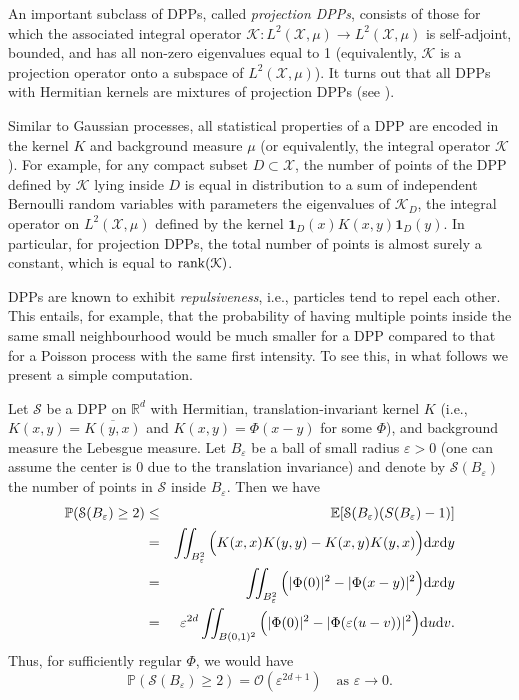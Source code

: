 An important subclass of DPPs, called \emph{projection DPPs}, consists of those for which the associated integral operator $\mathcal K: L^2(\mathcal X,\mu) \rightarrow L^2(\mathcal X,\mu)$ is self-adjoint, bounded, and has all non-zero eigenvalues equal to 1 (equivalently, $\mathcal K$ is a projection operator onto a subspace of $L^2(\mathcal X,\mu)$). It turns out that all DPPs with Hermitian kernels are mixtures of projection DPPs (see \cite{HKPV}).

Similar to Gaussian processes, all statistical properties of a DPP are encoded in the
kernel $K$ and background measure $\mu$ (or equivalently, the integral operator $\mathcal K$). For example, for any compact subset $D\subset \mathcal X$, the number of points of the DPP defined by $\mathcal K$ lying inside $D$ is equal in distribution to a sum of independent Bernoulli random variables with parameters the eigenvalues of $\mathcal K_D$, the integral operator on $L^2(\mathcal X,\mu)$ defined by the kernel $\mathbf{1}_D(x)K(x,y)\mathbf{1}_D(y)$. In particular, for projection DPPs, the total number of points is almost surely a constant, which is equal to $\rank(\mathcal K)$.

DPPs are known to exhibit \emph{repulsiveness}, i.e., particles tend to repel each other. This entails, for example, that the probability of having multiple points inside the same small neighbourhood would be much smaller for a DPP compared to that for a Poisson process with the same first intensity. To see this, in what follows we present a simple computation.

Let $\mathcal S$ be a DPP on $\mathbb R^d$ with Hermitian, translation-invariant kernel $K$ (i.e., $K(x,y) = \overline{K(y,x)}$ and $K(x,y)=\Phi(x-y)$ for some $\Phi$), and background measure the Lebesgue measure. Let $B_\varepsilon$ be a ball of small radius $\varepsilon>0$ (one can assume the center is $0$ due to the translation invariance) and denote by $\mathcal S(B_\varepsilon)$ the number of points in $\mathcal S$ inside $B_\varepsilon$. Then we have
\begin{eqnarray*}
    \mathbb P(\mathcal S(B_\varepsilon) \ge 2) &\le& \mathbb E[\mathcal S(B_\varepsilon)(S(B_\varepsilon)-1)] \\
    &=&\iint_{B_\varepsilon^2} \Big( K(x,x)K(y,y) - K(x,y)K(y,x) \Big ) \mathrm{d} x \mathrm{d} y\\
    &=&\iint_{B_\varepsilon^2} \Big( |\Phi(0)|^2 - |\Phi(x-y)|^2 \Big ) \mathrm{d} x \mathrm{d} y \\
    &=& \varepsilon^{2d} \iint_{B(0,1)^2} \Big( |\Phi(0)|^2 - |\Phi(\varepsilon(u-v))|^2 \Big ) \mathrm{d} u \mathrm{d} v.
\end{eqnarray*}
Thus, for sufficiently regular $\Phi$, 
we would have
\begin{equation} \label{eq:DPP_repel}
    \mathbb P(\mathcal S(B_\varepsilon) \ge 2) = \mathcal{O}(\varepsilon^{2d+1}) \quad \text{as } \varepsilon\rightarrow 0.
\end{equation}

